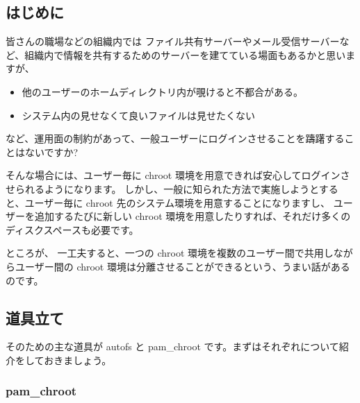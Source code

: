 \subsection{はじめに}
皆さんの職場などの組織内では
ファイル共有サーバーやメール受信サーバーなど、組織内で情報を共有するためのサーバーを建てている場面もあるかと思いますが、
\begin{itemize}
\item 他のユーザーのホームディレクトリ内が覗けると不都合がある。
\item システム内の見せなくて良いファイルは見せたくない
\end{itemize}
など、運用面の制約があって、一般ユーザーにログインさせることを躊躇することはないですか?

そんな場合には、ユーザー毎に chroot 環境を用意できれば安心してログインさせられるようになります。
しかし、一般に知られた方法で実施しようとすると、ユーザー毎に chroot 先のシステム環境を用意することになりますし、
ユーザーを追加するたびに新しい chroot 環境を用意したりすれば、それだけ多くのディスクスペースも必要です。

ところが、 一工夫すると、一つの chroot 環境を複数のユーザー間で共用しながらユーザー間の chroot 環境は分離させることができるという、うまい話があるのです。

\subsection{道具立て}

そのための主な道具が autofs と pam\_chroot です。まずはそれぞれについて紹介をしておきましょう。

\subsubsection{pam\_chroot}

